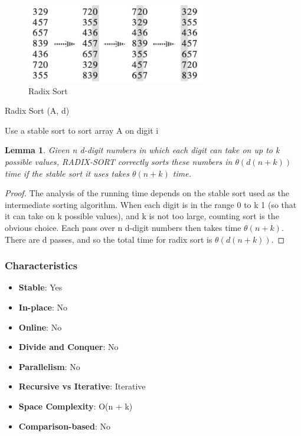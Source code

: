 \begin{figure}[H]
    \centering
    \includegraphics[width=0.7\textwidth]{assets/radixsort.png}
    \caption{Radix Sort \cite{cormen2022introduction}}
\end{figure}

\begin{algorithm}[H]
    \caption{Radix Sort (A, d)}
    \begin{algorithmic}[1]
            \State Use a stable sort to sort array A on digit i
        \EndFor
        \State {}
    \end{algorithmic}
\end{algorithm}

\newpage

\newtheorem{Lemma}{Lemma}
\begin{Lemma}
    Given n d-digit numbers in which each digit can take on up to k possible values,
    RADIX-SORT correctly sorts these numbers in $\theta(d(n+k))$ time if the stable sort
    it uses takes $\theta(n+k)$ time.\end{Lemma}
\begin{proof}
    The analysis of the running time depends on the stable
    sort used as the intermediate sorting algorithm. When each digit is in the range 0
    to k 1 (so that it can take on k possible values), and k is not too large, counting sort
    is the obvious choice. Each pass over n d-digit numbers then takes time $\theta(n+k)$.
    There are d passes, and so the total time for radix sort is $\theta(d(n+k))$.
\end{proof}

\subsubsection*{Characteristics}

\begin{multicols}{2}
    \begin{itemize}
        \item \textbf{Stable}: Yes
        \item \textbf{In-place}: No
        \item \textbf{Online}: No
        \item \textbf{Divide and Conquer}: No
        \item \textbf{Parallelism}: No
        \item \textbf{Recursive vs Iterative}: Iterative
        \item \textbf{Space Complexity}: O(n + k)
        \item \textbf{Comparison-based}: No 
    \end{itemize}
\end{multicols}

